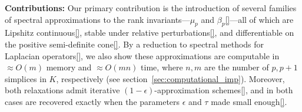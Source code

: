 \documentclass[10pt]{article}
\numberwithin{equation}{section}
\newcommand{\+}{%
	\raisebox{0.18ex}{\scaleobj{0.55}{+}}
}
\theoremstyle{definition}
\theoremstyle{definition}
\begin{document}
\noindent 
\textbf{Contributions:} Our primary contribution is the introduction of several families of spectral approximations to the rank invariants---$\mu_p$ and $\beta_p$\ref{}---all of which are Lipshitz continuous\ref{}, stable under relative perturbations\ref{}, and differentiable on the positive semi-definite cone\ref{}. By a reduction to spectral methods for Laplacian operators\ref{}, we also show these approximations are computable in $\approx O(m)$ memory and $\approx O(mn)$ time, where $n,m$ are the number of $p, p+1$ simplices in $K$, respectively (see section~\ref{sec:computational_imp}). 
Moreover, both relaxations admit iterative $(1-\epsilon)$-approximation schemes\ref{}, and in both cases are recovered exactly when the parameters $\epsilon$ and $\tau$ made small enough\ref{}. 
\end{document}
